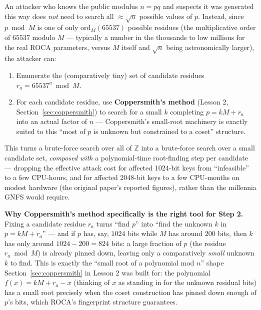 \begin{proposition}
An attacker who knows the public modulus $n = pq$ and suspects it was generated this way does \emph{not} need to search all $\approx \sqrt{n}$ possible values of $p$. Instead, since $p \bmod M$ is one of only $\mathrm{ord}_M(65537)$ possible residues (the multiplicative order of $65537$ modulo $M$ — typically a number in the thousands to low millions for the real ROCA parameters, versus $M$ itself and $\sqrt n$ being astronomically larger), the attacker can:
\begin{enumerate}
\item Enumerate the (comparatively tiny) set of candidate residues $r_a = 65537^a \bmod M$.
\item For each candidate residue, use \textbf{Coppersmith's method} (Lesson 2, Section~\ref{sec:coppersmith}) to search for a small $k$ completing $p = kM + r_a$ into an actual factor of $n$ — Coppersmith's small-root machinery is exactly suited to this ``most of $p$ is unknown but constrained to a coset'' structure.
\end{enumerate}
This turns a brute-force search over all of $\mathbb{Z}$ into a brute-force search over a small candidate set, \emph{composed with} a polynomial-time root-finding step per candidate — dropping the effective attack cost for affected 1024-bit keys from ``infeasible'' to a few CPU-hours, and for affected 2048-bit keys to a few CPU-months on modest hardware (the original paper's reported figures), rather than the millennia GNFS would require.
\end{proposition}

\medskip\noindent\textbf{Why Coppersmith's method specifically is the right tool for Step 2.} Fixing a candidate residue $r_a$ turns ``find $p$'' into ``find the unknown $k$ in $p=kM+r_a$'' — and if $p$ has, say, $1024$ bits while $M$ has around $200$ bits, then $k$ has only around $1024-200=824$ bits: a large fraction of $p$ (the residue $r_a\bmod M$) is already pinned down, leaving only a comparatively \emph{small} unknown $k$ to find. This is exactly the ``small root of a polynomial mod $n$'' shape Section~\ref{sec:coppersmith} in Lesson 2 was built for: the polynomial $f(x)=kM+r_a-x$ (thinking of $x$ as standing in for the unknown residual bits) has a small root precisely when the coset construction has pinned down enough of $p$'s bits, which ROCA's fingerprint structure guarantees.

